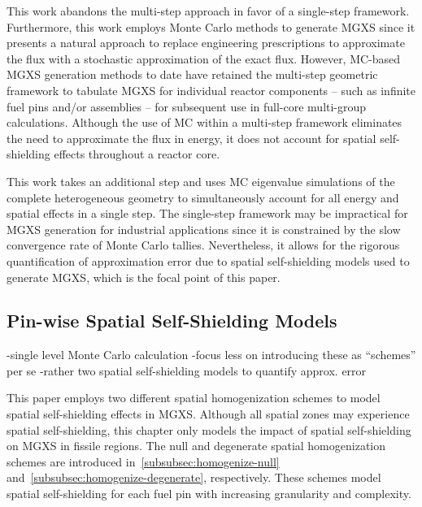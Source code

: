 This work abandons the multi-step approach in favor of a single-step framework. Furthermore, this work employs Monte Carlo methods to generate MGXS since it presents a natural approach to replace engineering prescriptions to approximate the flux with a stochastic approximation of the exact flux. However, MC-based MGXS generation methods to date have retained the multi-step geometric framework to tabulate MGXS for individual reactor components -- such as infinite fuel pins and/or assemblies -- for subsequent use in full-core multi-group calculations. Although the use of MC within a multi-step framework eliminates the need to approximate the flux in energy, it does not account for spatial self-shielding effects throughout a reactor core. 

This work takes an additional step and uses MC eigenvalue simulations of the complete heterogeneous geometry to simultaneously account for all energy and spatial effects in a single step. The single-step framework may be impractical for MGXS generation for industrial applications since it is constrained by the slow convergence rate of Monte Carlo tallies. Nevertheless, it allows for the rigorous quantification of approximation error due to spatial self-shielding models used to generate MGXS, which is the focal point of this paper.


\subsection{Pin-wise Spatial Self-Shielding Models}
\label{subsec:homogenize}

-single level Monte Carlo calculation
-focus less on introducing these as ``schemes'' per se
  -rather two spatial self-shielding models to quantify approx. error

This paper employs two different spatial homogenization schemes to model spatial self-shielding effects in MGXS. Although all spatial zones may experience spatial self-shielding, this chapter only models the impact of spatial self-shielding on MGXS in fissile regions. The null and degenerate spatial homogenization schemes are introduced in~\autoref{subsubsec:homogenize-null} and~\autoref{subsubsec:homogenize-degenerate}, respectively. These schemes model spatial self-shielding for each fuel pin with increasing granularity and complexity. 


